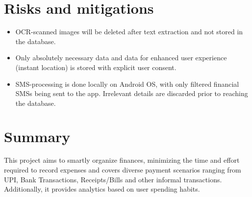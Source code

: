 \documentclass[11pt,a4paper]{article}
\begin{document}
\section{Risks and mitigations}
\begin{itemize}[leftmargin=0.7cm]
    \item OCR-scanned images will be deleted after text extraction and not stored in the database.
    \item Only absolutely necessary data and data for enhanced user experience (instant location) is stored with explicit user consent.
    \item SMS-processing is done locally on Android OS, with only filtered financial SMSs being sent to the app. Irrelevant details are discarded prior to reaching the database.
\end{itemize}


\section{Summary}
This project aims to smartly organize finances, minimizing the time and effort required to record expenses and covers diverse payment scenarios ranging from UPI, Bank Transactions, Receipts/Bills and other informal transactions. Additionally, it provides analytics based on user spending habits.
\end{document}
